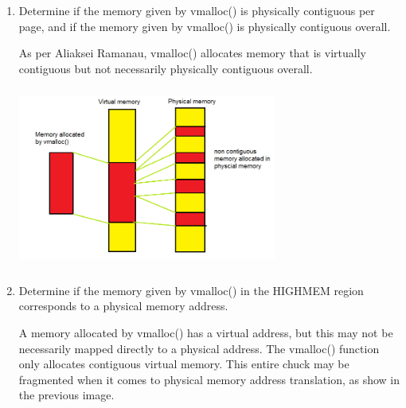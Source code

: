 \documentclass[conference]{IEEEtran}
\newcommand\tab[1][0.5cm]{\hspace*{#1}}
\begin{document}
\begin{enumerate}

\item Determine if the memory given by vmalloc() is physically contiguous per page, and if
the memory given by vmalloc() is physically contiguous overall. 

\tab As per Aliaksei Ramanau, vmalloc() allocates memory that is virtually contiguous but not necessarily physically contiguous overall.
\begin{center}
	\includegraphics[width=8.5cm, height=6cm]{memory7.jpg}
\end{center}

\item Determine if the memory given by vmalloc() in the HIGHMEM region corresponds to
a physical memory address.

\tab A memory allocated by vmalloc() has a virtual address, but this may not be necessarily mapped directly to a physical address. The vmalloc() function only allocates contiguous virtual memory. This entire chuck may be fragmented when it comes to physical memory address translation, as show in the previous image.
\end{enumerate}
\end{document}
